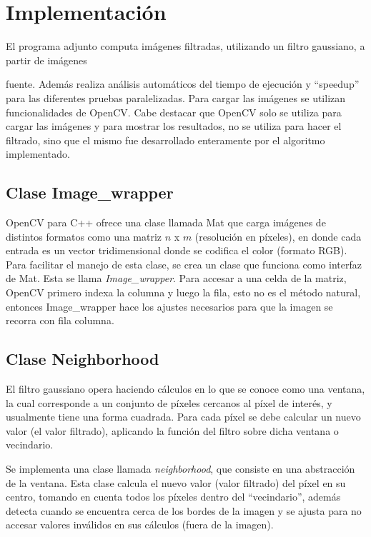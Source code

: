 \documentclass {article}
\begin{document}
\section{Implementación}

El programa adjunto computa imágenes filtradas, utilizando un filtro gaussiano, a partir de imágenes

fuente. Además realiza análisis automáticos del tiempo de ejecución y ``speedup'' para las
diferentes pruebas paralelizadas. Para cargar las imágenes se utilizan funcionalidades de
OpenCV. \cite{opencv}
Cabe destacar que OpenCV solo se utiliza para cargar las imágenes y para mostrar los
resultados, no se utiliza para hacer el filtrado, sino que el mismo fue desarrollado enteramente por
el algoritmo implementado.


\subsection{Clase Image\_wrapper}

OpenCV para C++ ofrece una clase llamada Mat que carga imágenes de distintos formatos como una
matriz $n$ x $m$ (resolución en píxeles), en donde cada entrada es un vector tridimensional donde se
codifica el color (formato RGB). Para facilitar el manejo de esta clase, se crea un clase que
funciona como interfaz de Mat. Esta se llama \textit{Image\_wrapper}. Para accesar a una celda de la
matriz, OpenCV primero indexa la columna y luego la fila, esto no es el método natural, entonces
Image\_wrapper hace los ajustes necesarios para que la imagen se recorra con fila columna.


\subsection{Clase Neighborhood}
El filtro gaussiano opera haciendo cálculos en lo que se conoce como una ventana, la cual
corresponde a un conjunto de píxeles cercanos al píxel de interés, y usualmente tiene una forma
cuadrada. Para cada píxel se debe calcular un nuevo valor (el valor filtrado), aplicando la función
del filtro sobre dicha ventana o vecindario.

Se implementa una clase llamada \textit{neighborhood}, que consiste en una abstracción de la
ventana. Esta clase calcula el nuevo valor (valor filtrado) del píxel en su centro, tomando en
cuenta todos los píxeles dentro del ``vecindario'', además detecta cuando se encuentra cerca de los
bordes de la imagen y se ajusta para no accesar valores inválidos en sus cálculos (fuera de la
imagen).
\end{document}
